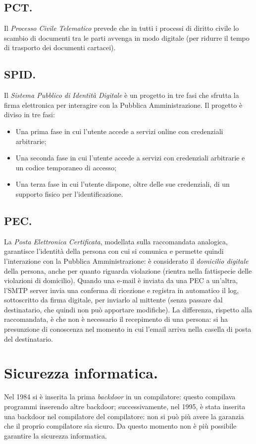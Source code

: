 \documentclass[a4page, 11pt, twocolumn]{article}
\begin{document}
\subsection{PCT.}
Il \textit{Processo Civile Telematico} prevede che in tutti i processi di diritto civile lo scambio di documenti tra le parti avvenga in modo digitale (per ridurre il tempo di trasporto dei documenti cartacei). \newline

\subsection{SPID.}
Il \textit{Sistema Pubblico di Identità Digitale} è un progetto in tre fasi che sfrutta la firma elettronica per interagire con la Pubblica Amministrazione. Il progetto è diviso in tre fasi:
\begin{itemize}
\item Una prima fase in cui l'utente accede a servizi online con credenziali arbitrarie;
\item Una seconda fase in cui l'utente accede a servizi con credenziali arbitrarie e un codice temporaneo di accesso;
\item Una terza fase in cui l'utente dispone, oltre delle sue credenziali, di un supporto fisico per l'identificazione.
\end{itemize}

\subsection{PEC.}
La \textit{Posta Elettronica Certificata}, modellata sulla raccomandata analogica, garantisce l'identità della persona con cui si comunica e permette quindi l'interazione con la Pubblica Amministrazione: è considerato il \textit{domicilio digitale} della persona, anche per quanto riguarda violazione (rientra nella fattispecie delle violazioni di domicilio).
Quando una e-mail è inviata da una PEC a un'altra, l'SMTP server invia una conferma di ricezione e registra in automatico il log, sottoscritto da firma digitale, per inviarlo al mittente (senza passare dal destinatario, che quindi non può apportare modifiche).
La differenza, rispetto alla raccomandata, è che non è necessario il recepimento di una persona: si ha presunzione di conoscenza nel momento in cui l'email arriva nella casella di posta del destinatario.

\section{Sicurezza informatica.}
Nel 1984 si è inserita la prima \textit{backdoor} in un compilatore: questo compilava programmi inserendo altre backdoor; successivamente, nel 1995, è stata inserita una backdoor nel compilatore del compilatore: non si può più avere la garanzia che il proprio compilatore sia sicuro.
Da questo momento non è più possibile garantire la sicurezza informatica.
\end{document}
